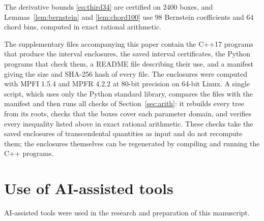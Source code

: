 \documentclass[11pt]{amsart}
\theoremstyle{definition}
\theoremstyle{remark}
\numberwithin{equation}{section}
\begin{document}
The derivative bounds \eqref{eq:third34} are certified on $2400$ boxes, and Lemmas~\ref{lem:bernstein} and \ref{lem:chord100} use $98$ Bernstein coefficients and $64$ chord bins, computed in exact rational arithmetic.

The supplementary files accompanying this paper contain the C++17 programs that produce the interval enclosures, the saved interval certificates, the Python programs that check them, a README file describing their use, and a manifest giving the size and SHA-256 hash of every file. The enclosures were computed with MPFI 1.5.4 and MPFR 4.2.2 at $80$-bit precision on 64-bit Linux. A single script, which uses only the Python standard library, compares the files with the manifest and then runs all checks of Section~\ref{sec:arith}: it rebuilds every tree from its roots, checks that the boxes cover each parameter domain, and verifies every inequality listed above in exact rational arithmetic. These checks take the saved enclosures of transcendental quantities as input and do not recompute them; the enclosures themselves can be regenerated by compiling and running the C++ programs.

\section*{Use of AI-assisted tools}
AI-assisted tools were used in the research and preparation of this manuscript.
\end{document}
